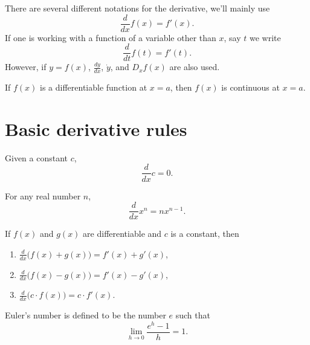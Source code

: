 \documentclass{ximera}
\newcommand{\dd}[2][]{\frac{d #1}{d #2}}
\newcommand{\ddx}{\frac{d}{dx}}
\begin{document}
\begin{definition}
There are several different notations for the derivative, we'll mainly
use
\[
\ddx f(x) = f'(x).
\]
If one is working with a function of a variable other than $x$, say $t$ we write
\[
\dd{t} f(t) = f'(t).
\]
However, if $y = f(x)$, $\dd[y]{x}$, $\dot{y}$, and $D_x f(x)$ are
also used.
\end{definition}




\begin{theorem}
If $f(x)$ is a differentiable function at $x = a$, then $f(x)$ is
continuous at $x=a$.
\end{theorem}







\section*{Basic derivative rules}







\begin{theorem}
Given a constant $c$,
\[
\ddx c = 0.
\]
\end{theorem}




\begin{theorem}
For any real number $n$,
\[
\ddx x^n = n x^{n-1}.
\]
\end{theorem}




\begin{theorem}
If $f(x)$ and $g(x)$ are differentiable and $c$ is a constant, then
\begin{enumerate}
\item\label{SR:1} $\ddx \big( f(x) + g(x)\big) = f'(x) + g'(x)$,
\item $\ddx \big( f(x) - g(x)\big) = f'(x) - g'(x)$,
\item $\ddx \big(c\cdot f(x)\big) = c\cdot f'(x)$.
\end{enumerate}
\end{theorem}




\begin{definition}
Euler's number is defined to be the number $e$ such that
\[
\lim_{h\to 0} \frac{e^h-1}{h} = 1.
\]
\end{definition}
\end{document}
